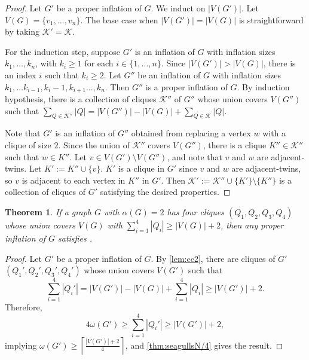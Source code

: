 \documentclass[11pt]{article}
\numberwithin{equation}{section}
\theoremstyle{plain}
\newtheorem{thm}[equation]{Theorem}
\theoremstyle{definition}
\renewcommand{\geq}{\geqslant}
\begin{document}
\begin{proof}
    Let $G'$ be a proper inflation of $G$. We induct on $|V(G')|$. Let $V(G) = \{ v_1, \dots, v_n \}$.
    The base case when $|V(G')| = |V(G)|$ is straightforward by taking $\mathcal{K}' = \mathcal{K}$.

    For the induction step, suppose $G'$ is an inflation of $G$ with inflation sizes $k_1, \dots, k_n$, with $k_i \geq 1$ for each $i \in \{ 1, \dots, n \}$. Since $|V(G')| > |V(G)|$, there is an index $i$ such that $k_i \geq 2$. Let $G''$ be an inflation of $G$ with inflation sizes $k_1, \dots k_{i-1},  k_i - 1, k_{i+1} \dots,k_n$. Then $G''$ is a proper inflation of $G$. By induction hypothesis, there is a collection of cliques $\mathcal{K}''$ of $G''$ whose union covers $V(G'')$ such that $\sum_{Q \in \mathcal{K''}} |Q| = |V(G'')| - |V(G)| + \sum_{Q \in \mathcal{K}} |Q|$.

    Note that $G'$ is an inflation of $G''$ obtained from replacing a vertex $w$ with a clique of size $2$. Since the union of $\mathcal{K}''$ covers $V(G'')$, there is a clique $K'' \in \mathcal{K}''$ such that $w \in K''$. Let $v \in V(G') \setminus V(G'')$, and note that $v$ and $w$ are adjacent-twins. Let $K':= K'' \cup \{ v \}$. $K'$ is a clique in $G'$ since $v$ and $w$ are adjacent-twins, so $v$ is adjacent to each vertex in $K''$ in $G'$. Then $\mathcal{K}':= \mathcal{K}'' \cup \{ K' \} \setminus \{ K'' \} $ is a collection of cliques of $G'$ satisfying the desired properties.
\end{proof}
\begin{thm}
    \label{thm:fcc}
    If a graph $G$ with $\alpha(G) = 2$ has four cliques $(Q_1, Q_2, Q_3, Q_4)$ whose union covers $V(G)$ with $\sum_{i=1}^4 |Q_i| \geq |V(G)| + 2$, then any proper inflation of $G$ satisfies .
\end{thm}
\begin{proof}
    Let $G'$ be a proper inflation of $G$. By \cref{lem:cc2}, there are cliques of $G'$ $(Q_1', Q_2', Q_3', Q_4')$ whose union covers $V(G')$ such that
    \begin{equation*}
        \sum_{i=1}^4 |Q_i'| = |V(G')| - |V(G)| + \sum_{i=1}^4 |Q_i| \geq |V(G')| + 2.
    \end{equation*}
    Therefore,
    \begin{equation*}
        4\omega(G') \geq \sum_{i=1}^4 |Q_i'| \geq |V(G')| + 2,
    \end{equation*}
    implying
    $\omega(G') \geq \left\lceil \frac{|V(G')| + 2}{4}\right\rceil$, and \cref{thm:seagullsN/4} gives the result.
\end{proof}
\end{document}
